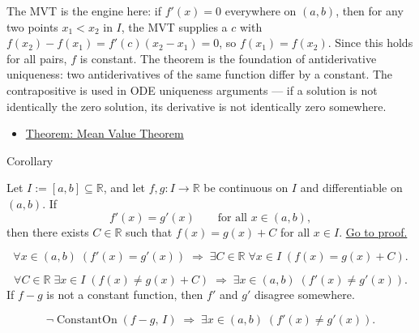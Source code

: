 \begin{remark*}[Interpretation]
The MVT is the engine here: if $f'(x) = 0$ everywhere on $(a,b)$, then for any two points $x_1 < x_2$ in $I$, the MVT supplies a $c$ with $f(x_2)-f(x_1) = f'(c)(x_2-x_1) = 0$, so $f(x_1) = f(x_2)$. Since this holds for all pairs, $f$ is constant. The theorem is the foundation of antiderivative uniqueness: two antiderivatives of the same function differ by a constant. The contrapositive is used in ODE uniqueness arguments --- if a solution is not identically the zero solution, its derivative is not identically zero somewhere.
\end{remark*}

\begin{dependencies}
\begin{itemize}
  \item \hyperref[thm:mean-value-theorem]{Theorem: Mean Value Theorem}
\end{itemize}
\end{dependencies}


\begin{corollarybox}{Corollary}
\begin{corollary}
\label{cor:equal-derivatives-constant-difference}
Let $I := [a,b] \subseteq \mathbb{R}$, and let $f, g : I \to \mathbb{R}$ be continuous on $I$ and differentiable on $(a,b)$. If
\[
f'(x) = g'(x) \qquad \text{for all } x \in (a,b),
\]
then there exists $C \in \mathbb{R}$ such that $f(x) = g(x) + C$ for all $x \in I$.
\hyperref[prf:equal-derivatives-constant-difference]{Go to proof.}
\end{corollary}
\end{corollarybox}

\begin{remark*}
\[
\forall x \in (a,b)\;(f'(x)=g'(x))
\;\Rightarrow\;
\exists C \in \mathbb{R}\;\forall x \in I\;(f(x)=g(x)+C).
\]
\end{remark*}

\begin{remark*}
\[
\forall C \in \mathbb{R}\;\exists x \in I\;(f(x) \neq g(x)+C)
\;\Rightarrow\;
\exists x \in (a,b)\;(f'(x) \neq g'(x)).
\]
If $f - g$ is not a constant function, then $f'$ and $g'$ disagree somewhere.
\end{remark*}

\begin{remark*}
\[
\lnot\operatorname{ConstantOn}(f-g,\,I) \;\Rightarrow\; \exists x\in(a,b)\;(f'(x)\neq g'(x)).
\]
\end{remark*}

